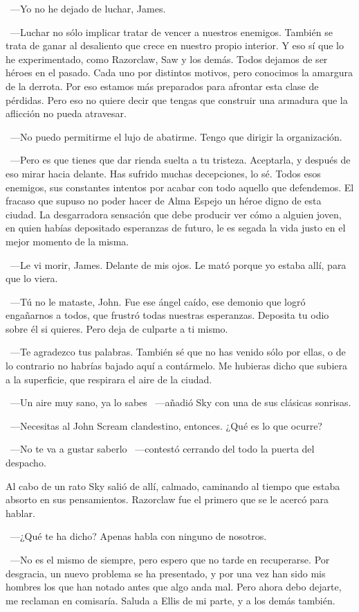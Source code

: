 ~---Yo no he dejado de luchar, James.

~---Luchar no sólo implicar tratar de vencer a nuestros enemigos. También se trata de ganar al desaliento que crece en nuestro propio interior. Y eso sí que lo he experimentado, como Razorclaw, Saw y los demás. Todos dejamos de ser héroes en el pasado. Cada uno por distintos motivos, pero conocimos la amargura de la derrota. Por eso estamos más preparados para afrontar esta clase de pérdidas. Pero eso no quiere decir que tengas que construir una armadura que la aflicción no pueda atravesar.

~---No puedo permitirme el lujo de abatirme. Tengo que dirigir la organización.

~---Pero es que tienes que dar rienda suelta a tu tristeza. Aceptarla, y después de eso mirar hacia delante. Has sufrido muchas decepciones, lo sé. Todos esos enemigos, sus constantes intentos por acabar con todo aquello que defendemos. El fracaso que supuso no poder hacer de Alma Espejo un héroe digno de esta ciudad. La desgarradora sensación que debe producir ver cómo a alguien joven, en quien habías depositado esperanzas de futuro, le es segada la vida justo en el mejor momento de la misma.

~---Le vi morir, James. Delante de mis ojos. Le mató porque yo estaba allí, para que lo viera.

~---Tú no le mataste, John. Fue ese ángel caído, ese demonio que logró engañarnos a todos, que frustró todas nuestras esperanzas. Deposita tu odio sobre él si quieres. Pero deja de culparte a ti mismo.

~---Te agradezco tus palabras. También sé que no has venido sólo por ellas, o de lo contrario no habrías bajado aquí a contármelo. Me hubieras dicho que subiera a la superficie, que respirara el aire de la ciudad.

~---Un aire muy sano, ya lo sabes ~---añadió Sky con una de sus clásicas sonrisas.

~---Necesitas al John Scream clandestino, entonces. ¿Qué es lo que ocurre?

~---No te va a gustar saberlo ~---contestó cerrando del todo la puerta del despacho.

Al cabo de un rato Sky salió de allí, calmado, caminando al tiempo que estaba absorto en sus pensamientos. Razorclaw fue el primero que se le acercó para hablar.

~---¿Qué te ha dicho? Apenas habla con ninguno de nosotros.

~---No es el mismo de siempre, pero espero que no tarde en recuperarse. Por desgracia, un nuevo problema se ha presentado, y por una vez han sido mis hombres los que han notado antes que algo anda mal. Pero ahora debo dejarte, me reclaman en comisaría. Saluda a Ellis de mi parte, y a los demás también.

